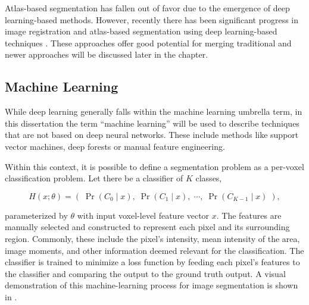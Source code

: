 Atlas-based segmentation has fallen out of favor due to the emergence of deep learning-based methods. However, recently there has been significant progress in image registration and atlas-based segmentation using deep learning-based techniques \cite{sinclairAtlasISTNJointSegmentation2022a}. These approaches offer good potential for merging traditional and newer approaches will be discussed later in the chapter.

\subsection{Machine Learning}

While deep learning generally falls within the machine learning umbrella term, in this dissertation the term ``machine learning'' will be used to describe techniques that are not based on deep neural networks. These include methods like support vector machines, deep forests or manual feature engineering.

Within this context, it is possible to define a segmentation problem as a per-voxel classification problem. Let there be a classifier of $K$ classes,

\begin{equation}
H(x; \theta) = (\;\operatorname{Pr}(C_0\!\mid\!x),\; \operatorname{Pr}(C_1\!\mid\!x),\; \cdots,\; \operatorname{Pr}(C_{K-1}\!\mid\!x)\;),
\end{equation}

parameterized by $\theta$ with input voxel-level feature vector $x$. The features are manually selected and constructed to represent each pixel and its surrounding region. Commonly, these include the pixel's intensity, mean intensity of the area, image moments, and other information deemed relevant for the classification. The classifier is trained to minimize a loss function by feeding each pixel's features to the classifier and comparing the output to the ground truth output. A visual demonstration of this machine-learning process for image segmentation is shown in .

